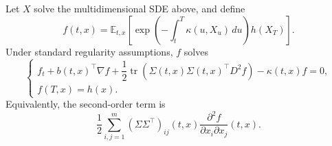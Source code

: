 \begin{thm}
Let $X$ solve the multidimensional SDE above, and define
\[
f(t,x)
=
\mathbb{E}_{t,x}\left[
\exp\left(-\int_t^T\kappa(u,X_u)\,du\right)
 h(X_T)
\right].
\]
Under standard regularity assumptions, $f$ solves
\[
\begin{cases}
 f_t+b(t,x)^\top\nabla f
 +\dfrac12\operatorname{tr}\!\left(
 \Sigma(t,x)\Sigma(t,x)^\top D^2f
 \right)
 -\kappa(t,x)f=0,\\[1ex]
 f(T,x)=h(x).
\end{cases}
\]
Equivalently, the second-order term is
\[
\frac12\sum_{i,j=1}^m
(\Sigma\Sigma^\top)_{ij}(t,x)
\frac{\partial^2f}{\partial x_i\partial x_j}(t,x).
\]
\end{thm}
